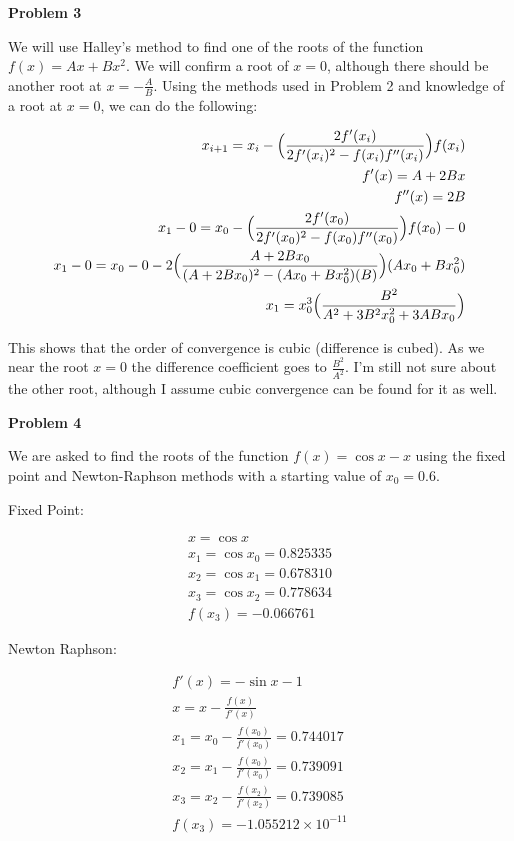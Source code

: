 \documentclass[a4paper,12pt]{article}
\begin{document}
{\bf Problem  3}
\smallskip

We will use Halley's method to find one of the roots of the function $f(x)=Ax+Bx^2$. We will confirm a root of $x=0$, although there should be another root at $x=-\frac{A}{B}$. Using the methods used in Problem 2 and knowledge of a root at $x=0$, we can do the following:

\begin{eqnarray*}
x_{i+1}=x_i- \Big{(} \frac{2f'(x_i)}{2f'(x_i)^2-f(x_i)f''(x_i)} \Big{)} f(x_i) \\
f'(x)=A+2Bx \\
f''(x)=2B \\
x_1-0=x_0-\Big{(} \frac{2f'(x_0)}{2f'(x_0)^2-f(x_0)f''(x_0)} \Big{)} f(x_0) -0 \\
x_1-0=x_0-0-2 \Big{(} \frac{A+2Bx_0}{(A+2Bx_0)^2-(Ax_0+Bx_0^2)(B)} \Big{)}(Ax_0+Bx_0^2) \\
x_1=x_0^3 \Big{(} \frac{B^2}{A^2+3B^2x_0^2+3ABx_0} \Big{)}
\end{eqnarray*} 

This shows that the order of convergence is cubic (difference is cubed). As we near the root $x=0$ the difference coefficient goes to $\frac{B^2}{A^2}$. I'm still not sure about the other root, although I assume cubic convergence can be found for it as well. 
\bigskip

{\bf Problem  4}
\smallskip

We are asked to find the roots of the function $f(x)=\cos{x}-x$ using the fixed point and Newton-Raphson methods with a starting value of $x_0=0.6$. 
\smallskip

Fixed Point:

\begin{eqnarray*}
x=\cos{x} \\
x_1=\cos{x_0}=0.825335 \\
x_2=\cos{x_1}=0.678310 \\
x_3=\cos{x_2}=0.778634 \\
f(x_3)=-0.066761
\end{eqnarray*}

Newton Raphson: 

\begin{eqnarray*}
f'(x)=-\sin{x}-1 \\
x=x-\frac{f(x)}{f'(x)} \\
x_1=x_0-\frac{f(x_0)}{f'(x_0)} = 0.744017 \\
x_2=x_1-\frac{f(x_0)}{f'(x_0)} = 0.739091 \\
x_3=x_2-\frac{f(x_2)}{f'(x_2)} = 0.739085 \\
f(x_3) = -1.055212 \times 10^{-11}
\end{eqnarray*}
\end{document}
